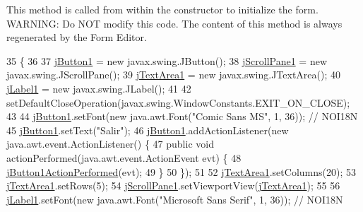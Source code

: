 This method is called from within the constructor to initialize the form. W\+A\+R\+N\+I\+NG\+: Do N\+OT modify this code. The content of this method is always regenerated by the Form Editor. 
\begin{DoxyCode}
35                                   \{
36 
37         \mbox{\hyperlink{classpecl6part2_1_1_modulo_vigilante_a1e6500588306c2830853cb56b0e21c6a}{jButton1}} = \textcolor{keyword}{new} javax.swing.JButton();
38         \mbox{\hyperlink{classpecl6part2_1_1_modulo_vigilante_a27f20917a0609de2eccd3550c9bfc8ca}{jScrollPane1}} = \textcolor{keyword}{new} javax.swing.JScrollPane();
39         \mbox{\hyperlink{classpecl6part2_1_1_modulo_vigilante_aafe6d08a0cded994a11a7d3dbf753f91}{jTextArea1}} = \textcolor{keyword}{new} javax.swing.JTextArea();
40         \mbox{\hyperlink{classpecl6part2_1_1_modulo_vigilante_a3997466e501d43312cb2638eb1f743c0}{jLabel1}} = \textcolor{keyword}{new} javax.swing.JLabel();
41 
42         setDefaultCloseOperation(javax.swing.WindowConstants.EXIT\_ON\_CLOSE);
43 
44         \mbox{\hyperlink{classpecl6part2_1_1_modulo_vigilante_a1e6500588306c2830853cb56b0e21c6a}{jButton1}}.setFont(\textcolor{keyword}{new} java.awt.Font(\textcolor{stringliteral}{"Comic Sans MS"}, 1, 36)); \textcolor{comment}{// NOI18N}
45         \mbox{\hyperlink{classpecl6part2_1_1_modulo_vigilante_a1e6500588306c2830853cb56b0e21c6a}{jButton1}}.setText(\textcolor{stringliteral}{"Salir"});
46         \mbox{\hyperlink{classpecl6part2_1_1_modulo_vigilante_a1e6500588306c2830853cb56b0e21c6a}{jButton1}}.addActionListener(\textcolor{keyword}{new} java.awt.event.ActionListener() \{
47             \textcolor{keyword}{public} \textcolor{keywordtype}{void} actionPerformed(java.awt.event.ActionEvent evt) \{
48                 \mbox{\hyperlink{classpecl6part2_1_1_modulo_vigilante_acfd165e42bad1854ee98d3740a9f4ffa}{jButton1ActionPerformed}}(evt);
49             \}
50         \});
51 
52         \mbox{\hyperlink{classpecl6part2_1_1_modulo_vigilante_aafe6d08a0cded994a11a7d3dbf753f91}{jTextArea1}}.setColumns(20);
53         \mbox{\hyperlink{classpecl6part2_1_1_modulo_vigilante_aafe6d08a0cded994a11a7d3dbf753f91}{jTextArea1}}.setRows(5);
54         \mbox{\hyperlink{classpecl6part2_1_1_modulo_vigilante_a27f20917a0609de2eccd3550c9bfc8ca}{jScrollPane1}}.setViewportView(\mbox{\hyperlink{classpecl6part2_1_1_modulo_vigilante_aafe6d08a0cded994a11a7d3dbf753f91}{jTextArea1}});
55 
56         \mbox{\hyperlink{classpecl6part2_1_1_modulo_vigilante_a3997466e501d43312cb2638eb1f743c0}{jLabel1}}.setFont(\textcolor{keyword}{new} java.awt.Font(\textcolor{stringliteral}{"Microsoft Sans Serif"}, 1, 36)); \textcolor{comment}{// NOI18N}

\end{DoxyCode}

